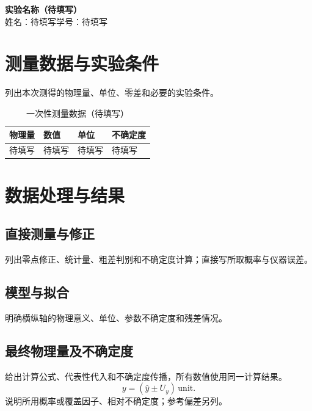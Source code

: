 \documentclass[12pt,a4paper,fontset=fandol]{ctexart}
\begin{document}
\begin{center}
  {\bfseries 实验名称（待填写）}\\[8pt]
  姓名：待填写\quad 学号：待填写
\end{center}

\section{测量数据与实验条件}
列出本次测得的物理量、单位、零差和必要的实验条件。
\begin{table}[htbp]
  \centering
  \caption{一次性测量数据（待填写）}
  \begin{tabularx}{\linewidth}{@{}lllX@{}}
    \toprule
    物理量 & 数值 & 单位 & 不确定度\\
    \midrule
    待填写 & 待填写 & 待填写 & 待填写\\
    \bottomrule
  \end{tabularx}
\end{table}

\section{数据处理与结果}
\subsection{直接测量与修正}
列出零点修正、统计量、粗差判别和不确定度计算；直接写所取概率与仪器误差。

\subsection{模型与拟合}
明确横纵轴的物理意义、单位、参数不确定度和残差情况。

\subsection{最终物理量及不确定度}
给出计算公式、代表性代入和不确定度传播，所有数值使用同一计算结果。
\[
  y=(\hat y\pm U_y)\,\mathrm{unit}.
\]
说明所用概率或覆盖因子、相对不确定度；参考偏差另列。
\end{document}
